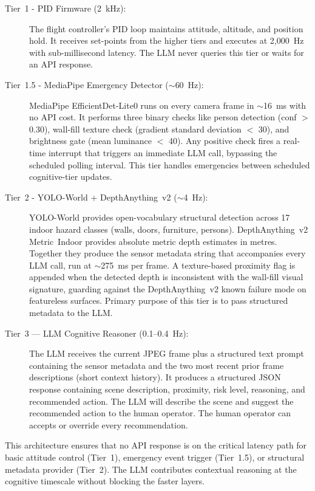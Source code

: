 \begin{description}
  \item[Tier~1 - PID Firmware (2~kHz):]
    The flight controller's PID loop maintains attitude, altitude, and position hold. 
    It receives set-points from the higher tiers and executes at 2,000~Hz with sub-millisecond latency. 
    The LLM never queries this tier or waits for an API response.
    \newpage
  \item[Tier~1.5 - MediaPipe Emergency Detector ($\sim$60~Hz):]
    MediaPipe EfficientDet-Lite0 \cite{tan2020efficientdet, lugaresi2019mediapipe} runs on every camera frame in $\sim$16~ms with no API cost. 
    It performs three binary checks like person detection (conf $>$ 0.30), wall-fill texture check (gradient standard deviation $<$ 30), and brightness gate (mean luminance $<$ 40). 
    Any positive check fires a real-time interrupt that triggers an immediate LLM call, bypassing the scheduled polling interval.
    This tier handles emergencies between scheduled cognitive-tier updates.
  \item[Tier~2 - YOLO-World + DepthAnything~v2 ($\sim$4~Hz):]
    YOLO-World \cite{cheng2024yoloworld} provides open-vocabulary structural detection across 17 indoor hazard classes (walls, doors, furniture, persons). 
    DepthAnything~v2 Metric~Indoor \cite{yang2024depthanythingv2}
    provides absolute metric depth estimates in metres. Together they produce the sensor metadata string that accompanies every LLM call, run at $\sim$275~ms per frame. 
    A texture-based proximity flag is appended when the detected depth is inconsistent with the wall-fill visual signature, guarding against the DepthAnything~v2 known failure mode on featureless surfaces.
    Primary purpose of this tier is to pass structured metadata to the LLM.
  \item[Tier~3 --- LLM Cognitive Reasoner (0.1--0.4~Hz):]
    The LLM receives the current JPEG frame plus a structured text prompt containing the sensor metadata and the two most recent prior frame descriptions (short context history). 
    It produces a structured JSON response containing scene description, proximity, risk level, reasoning, and recommended action. 
    The LLM will describe the scene and suggest the recommended action to the human operator. 
    The human operator can accepts or override every recommendation.
\end{description}

This architecture ensures that no API response is on the critical latency path for basic attitude control (Tier~1), emergency event trigger (Tier~1.5), or structural metadata provider (Tier~2). 
The LLM contributes contextual reasoning at the cognitive timescale without blocking the faster layers.

